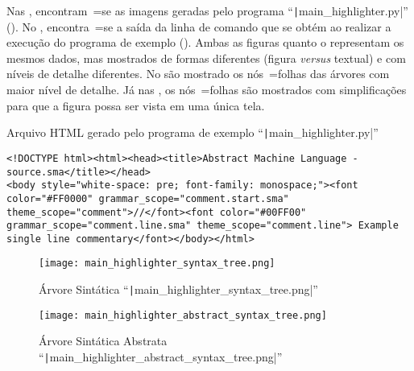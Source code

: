 Nas ,
encontram~=se as imagens geradas pelo programa ``\texttt|main_highlighter.py|'' ().
No ,
encontra~=se a saída da linha de comando que se obtém ao realizar a execução do programa de exemplo ().
Ambas as figuras  quanto o  representam os mesmos dados,
mas mostrados de formas diferentes (figura \textit{versus} textual) e
com níveis de detalhe diferentes.
No  são mostrado os nós~=folhas das árvores com maior nível de detalhe.
Já nas ,
os nós~=folhas são mostrados com simplificações para que a figura possa ser vista em uma única tela.
\begin{code}
\caption[Arquivo HTML gerado pelo programa de exemplo ``main\_highlighter.py'']{Arquivo HTML gerado pelo programa de exemplo ``\texttt|main_highlighter.py|''}
\label{code:MainHighlighterHtml}
\begin{verbatim}
<!DOCTYPE html><html><head><title>Abstract Machine Language - source.sma</title></head>
<body style="white-space: pre; font-family: monospace;"><font color="#FF0000" grammar_scope="comment.start.sma" theme_scope="comment">//</font><font color="#00FF00" grammar_scope="comment.line.sma" theme_scope="comment.line"> Example single line commentary</font></body></html>
\end{verbatim}
\end{code}

\begin{figure}[!htb]
\caption[Árvore Sintática ``main\_highlighter\_syntax\_tree.png'']{Árvore Sintática ``\texttt|main_highlighter_syntax_tree.png|''}
\label{figure:MainHighlighterSyntaxTree}
\centering
\texttt{[image: main\_highlighter\_syntax\_tree.png]}
\end{figure}

\begin{figure}[!htb]
\caption[Árvore Sintática Abstrata ``main\_highlighter\_abstract\_syntax\_tree.png'']{Árvore Sintática Abstrata ``\texttt|main_highlighter_abstract_syntax_tree.png|''}
\label{figure:MainHighlighterAbstractSyntaxTree}
\centering
\texttt{[image: main\_highlighter\_abstract\_syntax\_tree.png]}
\end{figure}

